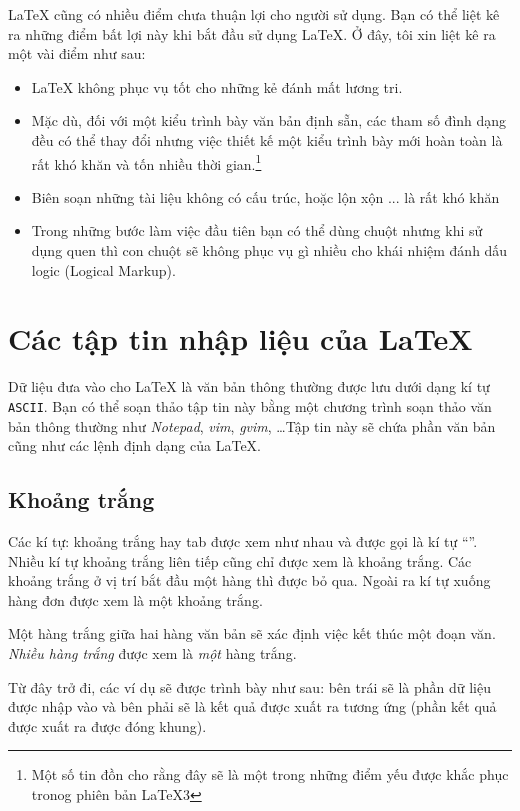 %
%

\medskip

\noindent \LaTeX{} cũng có nhiều điểm chưa thuận lợi cho người sử dụng. Bạn có thể liệt kê ra những điểm bất lợi này khi bắt đầu sử dụng \LaTeX{}. Ở đây, tôi xin liệt kê ra một vài điểm như sau:
\begin{itemize}
        \item \LaTeX{} không phục vụ tốt cho những kẻ đánh mất lương tri.
        \item Mặc dù, đối với một kiểu trình bày văn bản định sẵn,  các tham số đình dạng đều có thể thay đổi nhưng việc thiết kế một kiểu trình bày mới hoàn toàn là rất khó khăn và tốn nhiều thời gian.\footnote{Một số tin đồn cho rằng đây sẽ là một trong những điểm yếu được khắc phục tronog phiên bản \LaTeX{}3}
        \item Biên soạn những tài liệu không có cấu trúc, hoặc lộn xộn ... là rất khó khăn
        \item Trong những bước làm việc đầu tiên bạn có thể dùng chuột nhưng khi sử dụng quen thì con chuột sẽ không phục vụ gì nhiều cho khái nhiệm đánh dấu logic (Logical Markup).
\end{itemize}

\section{Các tập tin nhập liệu của \LaTeX{}}
Dữ liệu đưa vào cho \LaTeX{} là văn bản thông thường được lưu dưới dạng kí tự \texttt{ASCII}. Bạn có thể soạn thảo tập tin này bằng một chương trình soạn thảo văn bản thông thường như \emph{Notepad}, \emph{vim}, \emph{gvim}, \ldots Tập tin này sẽ chứa phần văn bản cũng như các lệnh định dạng của \LaTeX{}.

\subsection{Khoảng trắng}
Các kí tự: khoảng trắng hay tab được xem như nhau và được gọi là kí tự ``''. Nhiều kí tự khoảng trắng liên tiếp cũng chỉ được xem là  khoảng trắng. Các khoảng trắng ở vị trí bắt đầu một hàng thì được bỏ qua. Ngoài ra kí tự xuống hàng đơn được xem là một khoảng trắng. 

Một hàng trắng giữa hai hàng văn bản sẽ xác định việc kết thúc một đoạn văn. \emph{Nhiều hàng trắng} được xem là \emph{một} hàng trắng.

Từ đây trở đi, các ví dụ sẽ được trình bày như sau: bên trái sẽ là phần dữ liệu được nhập vào và bên phải sẽ là kết quả được xuất ra tương ứng (phần kết quả được xuất ra được đóng khung).

